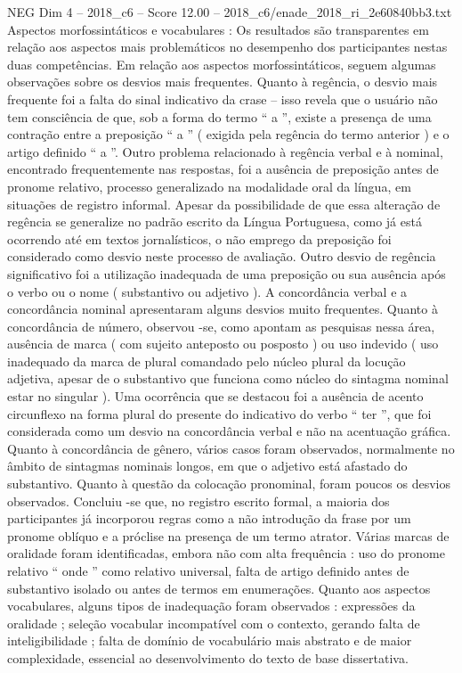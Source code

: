 \begin{textsample}{NEG Dim 4 – 2018\_c6 – Score 12.00 – 2018\_c6/enade\_2018\_ri\_2e60840bb3.txt}
Aspectos morfossintáticos e vocabulares : Os resultados são transparentes em relação aos aspectos mais problemáticos no desempenho dos participantes nestas duas competências.
Em relação aos aspectos morfossintáticos, seguem algumas observações sobre os desvios mais frequentes.
Quanto à regência, o desvio mais frequente foi a falta do sinal indicativo da crase – isso revela que o usuário não tem consciência de que, sob a forma do termo “ a ”, existe a presença de uma contração entre a preposição “ a ” ( exigida pela regência do termo anterior ) e o artigo definido “ a ”.
Outro problema relacionado à regência verbal e à nominal, encontrado frequentemente nas respostas, foi a ausência de preposição antes de pronome relativo, processo generalizado na modalidade oral da língua, em situações de registro informal.
Apesar da possibilidade de que essa alteração de regência se generalize no padrão escrito da Língua Portuguesa, como já está ocorrendo até em textos jornalísticos, o não emprego da preposição foi considerado como desvio neste processo de avaliação.
Outro desvio de regência significativo foi a utilização inadequada de uma preposição ou sua ausência após o verbo ou o nome ( substantivo ou adjetivo ).
A concordância verbal e a concordância nominal apresentaram alguns desvios muito frequentes.
Quanto à concordância de número, observou -se, como apontam as pesquisas nessa área, ausência de marca ( com sujeito anteposto ou posposto ) ou uso indevido ( uso inadequado da marca de plural comandado pelo núcleo plural da locução adjetiva, apesar de o substantivo que funciona como núcleo do sintagma nominal estar no singular ).
Uma ocorrência que se destacou foi a ausência de acento circunflexo na forma plural do presente do indicativo do verbo “ ter ”, que foi considerada como um desvio na concordância verbal e não na acentuação gráfica.
Quanto à concordância de gênero, vários casos foram observados, normalmente no âmbito de sintagmas nominais longos, em que o adjetivo está afastado do substantivo.
Quanto à questão da colocação pronominal, foram poucos os desvios observados.
Concluiu -se que, no registro escrito formal, a maioria dos participantes já incorporou regras como a não introdução da frase por um pronome oblíquo e a próclise na presença de um termo atrator.
Várias marcas de oralidade foram identificadas, embora não com alta frequência : uso do pronome relativo “ onde ” como relativo universal, falta de artigo definido antes de substantivo isolado ou antes de termos em enumerações.
Quanto aos aspectos vocabulares, alguns tipos de inadequação foram observados : expressões da oralidade ; seleção vocabular incompatível com o contexto, gerando falta de inteligibilidade ; falta de domínio de vocabulário mais abstrato e de maior complexidade, essencial ao desenvolvimento do texto de base dissertativa.

\end{textsample}
